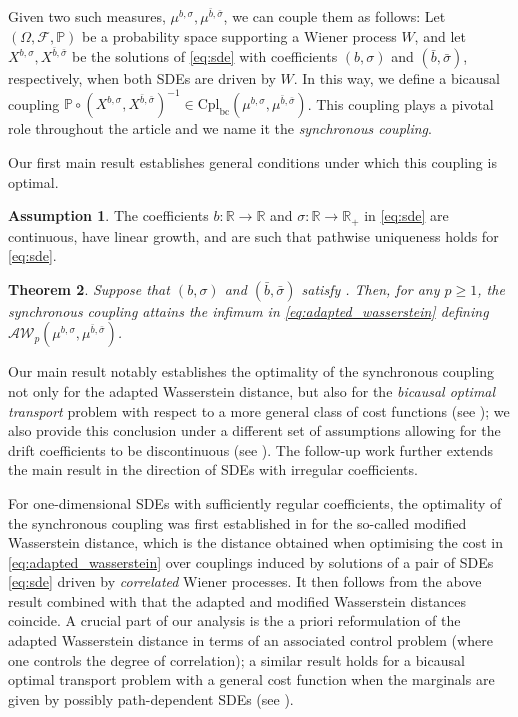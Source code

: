 \documentclass[oneside]{amsart}
\newtheorem{theorem}{Theorem}[section]
\theoremstyle{definition}
\newtheorem{assumption}[theorem]{Assumption}
\newcommand{\AW}{\mathcal A\mathcal W}
\newcommand{\R}{\mathbb R}
\newcommand{\Fc}{\mathcal{F}}
\newcommand{\cpl}{\mathrm{Cpl}}
\newcommand{\cplba}{\cpl_{\mathrm{bc}}}
\def\P{{\mathbb P}}
\def\R{{\mathbb R}}
\numberwithin{equation}{section}
\begin{document}
	Given two such measures, $\mu^{b,\sigma},\mu^{\bar b,\bar\sigma}$, we can couple them as follows: Let $(\Omega,\Fc,\P)$ be a probability space supporting a Wiener process $W$, and let $X^{b,\sigma},X^{\bar b,\bar\sigma}$ be the solutions of \eqref{eq:sde} with coefficients $(b, \sigma)$ and $(\bar b, \bar \sigma)$, respectively, when both SDEs are driven by $W$. In this way, we define a bicausal coupling $\P\circ (X^{b,\sigma},X^{\bar b,\bar\sigma})^{-1} \in \cplba(\mu^{b, \sigma}, \mu^{\bar b, \bar \sigma})$. This coupling plays a pivotal role throughout the article and we name it the \emph{synchronous coupling}. 
	
	Our first main result establishes general conditions under which this coupling is optimal. 
	
	\begin{assumption}\label{ass:main}
		The coefficients $b\colon \R \to \R$ and $\sigma\colon \R \to \R_+$ in \eqref{eq:sde} are continuous, have linear growth, and are such that pathwise uniqueness holds for \eqref{eq:sde}.
	\end{assumption}

	
	\begin{theorem}\label{thm:synchronous_optimal}
		Suppose that $(b, \sigma)$ and $(\bar b, \bar \sigma)$ satisfy . Then, for any $p\ge 1$, the synchronous coupling attains the infimum in \eqref{eq:adapted_wasserstein} defining $\AW_p(\mu^{b,\sigma},\mu^{\bar b,\bar\sigma})$. 
	\end{theorem}
	
	Our main result notably establishes the optimality of the synchronous coupling not only for the adapted Wasserstein distance, but also for the \emph{bicausal optimal transport} problem with respect to a more general class of cost functions (see ); we also provide this conclusion under a different set of assumptions allowing for the drift coefficients to be discontinuous (see ). The follow-up work \cite{RoSz24} further extends the main result in the direction of SDEs with irregular coefficients.
 
 	For one-dimensional SDEs with sufficiently regular coefficients, the optimality of the synchronous coupling was first established in \cite{BiTa19} for the so-called modified Wasserstein distance, which is the distance obtained when optimising the cost in \eqref{eq:adapted_wasserstein} over couplings induced by solutions of a pair of SDEs \eqref{eq:sde} driven by \emph{correlated} Wiener processes. 
 	It then follows from the above result combined with \cite[Section 2.1]{BiTa19} that the adapted and modified Wasserstein distances coincide.
 	A crucial part of our analysis is the a priori reformulation of the adapted Wasserstein distance in terms of an associated control problem (where one controls the degree of correlation); a similar result holds for a bicausal optimal transport problem with a general cost function when the marginals are given by possibly path-dependent SDEs (see ). 
	 	
\end{document}
